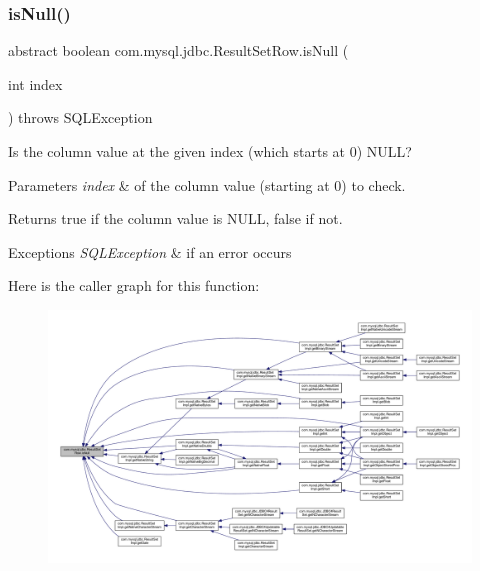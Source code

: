 \subsubsection{\texorpdfstring{is\+Null()}{isNull()}}
{\footnotesize\ttfamily abstract boolean com.\+mysql.\+jdbc.\+Result\+Set\+Row.\+is\+Null (\begin{DoxyParamCaption}\item[{int}]{index }\end{DoxyParamCaption}) throws S\+Q\+L\+Exception\hspace{0.3cm}{\ttfamily [abstract]}}

Is the column value at the given index (which starts at 0) N\+U\+LL?


\begin{DoxyParams}{Parameters}
{\em index} & of the column value (starting at 0) to check.\\
\hline
\end{DoxyParams}
\begin{DoxyReturn}{Returns}
true if the column value is N\+U\+LL, false if not.
\end{DoxyReturn}

\begin{DoxyExceptions}{Exceptions}
{\em S\+Q\+L\+Exception} & if an error occurs \\
\hline
\end{DoxyExceptions}
Here is the caller graph for this function\+:
\nopagebreak
\begin{figure}[H]
\begin{center}
\leavevmode
\includegraphics[width=350pt]{classcom_1_1mysql_1_1jdbc_1_1_result_set_row_a96243f8e7eb839c4c233a2e4aa1cfb6b_icgraph}
\end{center}
\end{figure}
\mbox{\label{classcom_1_1mysql_1_1jdbc_1_1_result_set_row_a7d2e1a3d54533e0655afdc0a411808ed}} 
